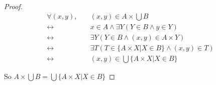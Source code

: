 \documentclass{article}
\begin{document}
\begin{proof}
    \begin{align*}
         \forall (x, y),\quad &(x, y) \in A \times \bigcup B \\
        \leftrightarrow & x \in A \land \exists Y (Y \in B \land y \in Y) \\
        \leftrightarrow & \exists Y(Y \in B \land (x, y) \in A \times Y) \\
        \leftrightarrow & \exists T(T \in  \{A \times X | X \in B \} \land (x, y) \in T) \\
        \leftrightarrow & (x, y) \in \bigcup \{A \times X | X \in B \}
    \end{align*}

    So $A \times \bigcup B = \bigcup \{A \times X | X \in B \}$
\end{proof}
\end{document}
